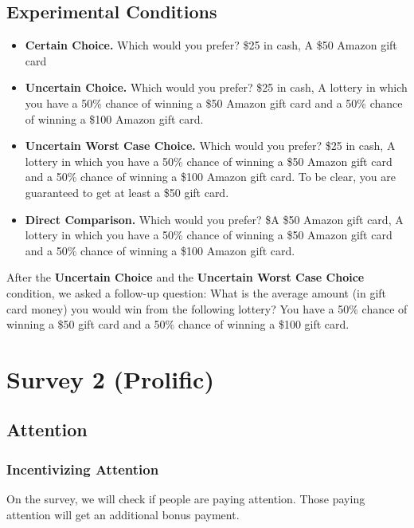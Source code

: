 \documentclass[12pt, letterpaper]{article}
\begin{document}
\subsection{Experimental Conditions}

\begin{itemize}
    \item \textbf{Certain Choice.} Which would you prefer? \$25 in cash, A \$50 Amazon gift card
    
    \item \textbf{Uncertain Choice.} Which would you prefer? \$25 in cash, A lottery in which you have a 50\% chance of winning a \$50 Amazon gift card and a 50\% chance of winning a \$100 Amazon gift card.
    
    \item \textbf{Uncertain Worst Case Choice.} Which would you prefer? \$25 in cash, A lottery in which you have a 50\% chance of winning a \$50 Amazon gift card and a 50\% chance of winning a \$100 Amazon gift card. To be clear, you are guaranteed to get at least a \$50 gift card.

    \item \textbf{Direct Comparison.} Which would you prefer? \$A \$50 Amazon gift card, A lottery in which you have a 50\% chance of winning a \$50 Amazon gift card and a 50\% chance of winning a \$100 Amazon gift card.
    
\end{itemize}

After the \textbf{Uncertain Choice} and the \textbf{Uncertain Worst Case Choice} condition, we asked a follow-up question:  What is the average amount (in gift card money) you would win from the following lottery? You have a 50\% chance of winning a \$50 gift card and a 50\% chance of winning a \$100 gift card.

\section{Survey 2 (Prolific)}

\subsection{Attention}

\subsubsection{Incentivizing Attention}
On the survey, we will check if people are paying attention. Those paying attention will get an additional bonus payment.
\end{document}
